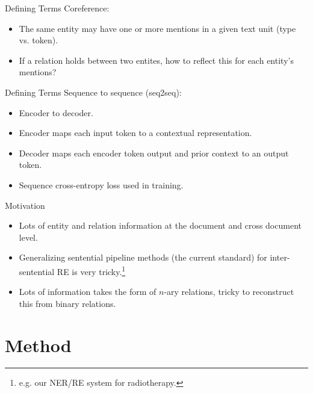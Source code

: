 \documentclass[usenames,dvipsnames,pdf]{beamer}
\begin{document}
        \begin{frame}{Defining Terms}
          Coreference:
          \begin{itemize}
          \item
            The same entity may have one or more mentions in a given text unit (type vs. token).
          \item
            If a relation holds between two entites, how to reflect this for each entity's mentions?
          \end{itemize}
        \end{frame}

        \begin{frame}{Defining Terms}
          Sequence to sequence (seq2seq):
          \begin{itemize}
          \item
            Encoder to decoder.
          \item
            Encoder maps each input token to a contextual representation.
          \item
            Decoder maps each encoder token output and prior context to an output token.
          \item
            Sequence cross-entropy loss used in training.
          \end{itemize}
        \end{frame}
        
        \begin{frame}{Motivation}
          \begin{itemize}
          \item
            Lots of entity and relation information at the document and cross document level.
          \item
            Generalizing sentential pipeline methods (the current standard) for inter-sentential RE is very tricky.\footnote{e.g. our NER/RE system for radiotherapy.}
          \item
            Lots of information takes the form of $n$-ary relations, tricky to reconstruct this from binary relations.
          \end{itemize}
        \end{frame}
        
        \section{Method}
\end{document}
